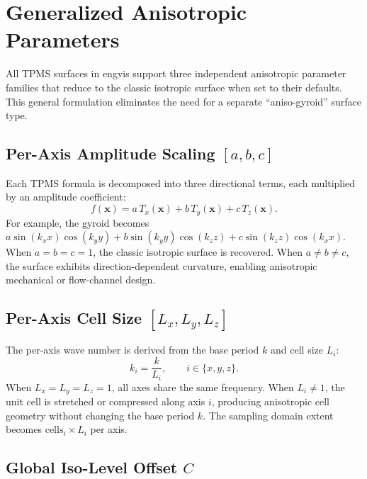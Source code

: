\documentclass[11pt]{article}
\begin{document}
\section{Generalized Anisotropic Parameters}\label{sec:aniso-params}

All TPMS surfaces in engvis support three independent anisotropic
parameter families that reduce to the classic isotropic surface when
set to their defaults.  This general formulation eliminates the need
for a separate ``aniso-gyroid'' surface type.

\subsection{Per-Axis Amplitude Scaling $[a, b, c]$}

Each TPMS formula is decomposed into three directional terms, each
multiplied by an amplitude coefficient:
\begin{equation}\label{eq:amplitude}
  f(\mathbf{x}) = a\,T_x(\mathbf{x}) + b\,T_y(\mathbf{x}) + c\,T_z(\mathbf{x}).
\end{equation}
For example, the gyroid becomes
$a\sin(k_x x)\cos(k_y y) + b\sin(k_y y)\cos(k_z z) + c\sin(k_z z)\cos(k_x x)$.
When $a = b = c = 1$, the classic isotropic surface is recovered.
When $a \neq b \neq c$, the surface exhibits direction-dependent
curvature, enabling anisotropic mechanical or flow-channel design.

\subsection{Per-Axis Cell Size $[L_x, L_y, L_z]$}

The per-axis wave number is derived from the base period $k$ and cell
size $L_i$:
\begin{equation}\label{eq:cell-size}
  k_i = \frac{k}{L_i}, \qquad i \in \{x, y, z\}.
\end{equation}
When $L_x = L_y = L_z = 1$, all axes share the same frequency.  When
$L_i \neq 1$, the unit cell is stretched or compressed along axis $i$,
producing anisotropic cell geometry without changing the base period $k$.
The sampling domain extent becomes $\text{cells}_i \times L_i$ per axis.

\subsection{Global Iso-Level Offset $C$}
\end{document}
